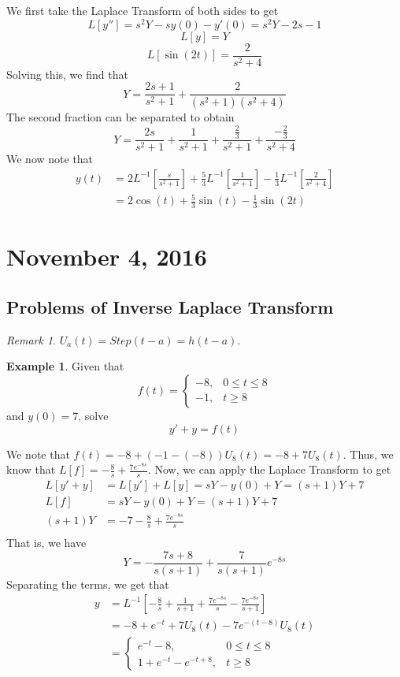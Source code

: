 \documentclass[11pt]{article}
\theoremstyle{plain} %
\theoremstyle{definition}
\theoremstyle{example}
\newtheorem*{example}{Example}
\theoremstyle{remark}
\newtheorem*{remark}{Remark}
\begin{document}
We first take the Laplace Transform of both sides to get $$L[y''] = s^2Y -sy(0) -y'(0) = s^2Y-2s-1$$ $$L[y] = Y$$
$$L\left[\sin(2t)\right] = \frac{2}{s^2+4}$$
Solving this, we find that $$Y = \frac{2s+1}{s^2+1} + \frac{2}{(s^2+1)(s^2+4)}$$
The second fraction can be separated to obtain $$Y = \frac{2s}{s^2+1} + \frac{1}{s^2+1} +  \frac{\frac{2}{3}}{s^2+1} + \frac{-\frac{2}{3}}{s^2+4} $$
We now note that
\begin{align*}
	y(t) &= 2L^{-1}\left[\frac{s}{s^2+1}\right] +\frac{5}{3}L^{-1}\left[\frac{1}{s^2+1}\right] -\frac{1}{3}L^{-1}\left[\frac{2}{s^2+4}\right]\\
	&= 2\cos(t) + \frac{5}{3}\sin(t) - \frac{1}{3}\sin(2t)
\end{align*}





\section{November 4, 2016}
\subsection{Problems of Inverse Laplace Transform}

\begin{remark}
$U_a(t) = Step(t-a) = h(t-a)$.
\end{remark}


\begin{example}
Given that $$f(t) = \begin{cases}
-8, & 0 \leq t \leq 8 \\
-1, & t \geq 8
\end{cases}$$ and $y(0) = 7$, solve $$y' + y = f(t)$$
\end{example}
We note that $f(t) = -8 + (-1-(-8))U_8(t) = -8+7U_8(t)$. Thus, we know that $L[f] = -\frac{8}{s}+\frac{7e^{-8s}}{s}$. Now, we can apply the Laplace Transform to get
\begin{align*}
L[y' + y] &= L[y'] + L[y] = sY -y(0) + Y = (s+1)Y+7\\
L[f] & = sY -y(0) + Y = (s+1)Y+7\\
(s+1)Y &= -7-\frac{8}{s}+\frac{7e^{-8s}}{s} \\
\end{align*}
That is, we have $$Y = -\frac{7s+8}{s(s+1)} + \frac{7}{s(s+1)}e^{-8s}$$ Separating the terms, we get that 
\begin{align*}
y &= L^{-1}\left[-\frac{8}{s}+\frac{1}{s+1} + \frac{7e^{-8s}}{s} - \frac{7e^{-8s}}{s+1}\right]\\
&= -8+e^{-t}+7U_8(t) -7e^{-(t-8)}U_8(t)\\
&= \begin{cases}e^{-t}-8, & 0 \leq t \leq 8 \\ 1+e^{-t}-e^{-t+8}, & t \geq 8\end{cases}
\end{align*}
\end{document}
